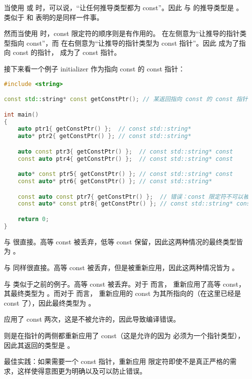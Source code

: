 \documentclass[../../LearnCpp.tex]{subfiles}
\begin{document}
当使用  或  时，可以说，“让任何推导类型都为 const”。因此  与  的推导类型是 。类似于  和  表明的是同样一件事。

然而当使用  时，const 限定符的顺序则是有作用的。 在左侧意为“让推导的指针类型指向 const”，而  在右侧意为“让推导的指针类型为 const 指针”。因此  成为了指向 const 的指针， 成为了 const 指针。

接下来看一个例子 initializer 作为指向 const 的 const 指针：

\begin{lstlisting}[language=C++]
#include <string>

const std::string* const getConstPtr(); // 某返回指向 const 的 const 指针的函数

int main()
{
    auto ptr1{ getConstPtr() };  // const std::string*
    auto* ptr2{ getConstPtr() }; // const std::string*

    auto const ptr3{ getConstPtr() };  // const std::string* const
    const auto ptr4{ getConstPtr() };  // const std::string* const

    auto* const ptr5{ getConstPtr() }; // const std::string* const
    const auto* ptr6{ getConstPtr() }; // const std::string*

    const auto const ptr7{ getConstPtr() };  // 错误：const 限定符不可以被二次应用
    const auto* const ptr8{ getConstPtr() }; // const std::string* const

    return 0;
}
\end{lstlisting}

 与  很直接。高等 const 被丢弃，低等 const 保留，因此这两种情况的最终类型皆为 。

 与  同样很直接。高等 const 被丢弃，但是被重新应用，因此这两种情况皆为 。

 与  类似于之前的例子。高等 const 被丢弃。对于  而言， 重新应用了高等 const，其最终类型为 。而对于  而言， 重新应用的 const 为其所指向的（在这里已经是 const 了），因此最终类型为 。

 应用了 const 两次，这是不被允许的，因此导致编译错误。

 则是在指针的两侧都重新应用了 const（这是允许的因为  必须为一个指针类型），因此其返回的类型是 。

最佳实践：如果需要一个 const 指针，重新应用  限定符即使不是真正严格的需求，这样使得意图更为明确以及可以防止错误。
\end{document}
